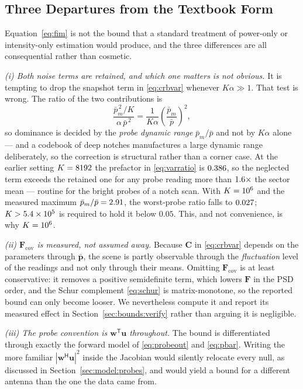 \documentclass[journal]{IEEEtran}
\newcommand{\uv}{\mathbf{u}}
\newcommand{\wv}{\mathbf{w}}
\newcommand{\pv}{\mathbf{p}}
\newcommand{\Herm}{\mathsf{H}}
\newcommand{\Tr}{\mathsf{T}}
\begin{document}
\subsection{Three Departures from the Textbook Form}
\label{sec:bounds:departures}

Equation~\eqref{eq:fim} is not the bound that a standard treatment of
power-only or intensity-only estimation would produce, and the three
differences are all consequential rather than cosmetic.

\emph{(i) Both noise terms are retained, and which one matters is not obvious.}
It is tempting to drop the snapshot term in \eqref{eq:crbvar} whenever
$K\alpha \gg 1$. That test is wrong. The ratio of the two contributions is
\begin{equation}
\frac{\bar{p}_m^{\,2}/K}{\alpha\,\bar{p}^{\,2}}
= \frac{1}{K\alpha}\left(\frac{\bar{p}_m}{\bar{p}}\right)^{\!2},
\label{eq:varratio}
\end{equation}
so dominance is decided by the \emph{probe dynamic range}
$\bar{p}_m/\bar{p}$ and not by $K\alpha$ alone --- and a codebook of deep
notches manufactures a large dynamic range deliberately, so the correction is
structural rather than a corner case. At the earlier setting $K = 8192$ the
prefactor in \eqref{eq:varratio} is $0.386$, so the neglected term
exceeds the retained one for any probe reading more than $1.6\times$
the sector mean --- routine for the bright probes of a notch scan. With
$K = 10^{6}$ and the measured maximum $\bar{p}_m/\bar{p} = 2.91$,
the worst-probe ratio falls to $0.027$; $K > 5.4\times10^{5}$ is required to
hold it below $0.05$. This, and not convenience, is why $K = 10^{6}$.

\emph{(ii) $\mathbf{F}_{\mathrm{cov}}$ is measured, not assumed away.} Because
$\mathbf{C}$ in \eqref{eq:crbvar} depends on the parameters through
$\bar{\pv}$, the scene is partly observable through the \emph{fluctuation}
level of the readings and not only through their means. Omitting
$\mathbf{F}_{\mathrm{cov}}$ is at least conservative: it removes a positive
semidefinite term, which lowers $\mathbf{F}$ in the PSD order, and the Schur
complement \eqref{eq:schur} is matrix-monotone, so the reported bound can only
become looser. We nevertheless compute it and report its measured effect in
Section~\ref{sec:bounds:verify} rather than arguing it is negligible.

\emph{(iii) The probe convention is $\wv^{\Tr}\uv$ throughout.} The bound is
differentiated through exactly the forward model of \eqref{eq:probeout} and
\eqref{eq:pbar}. Writing the more familiar $|\wv^{\Herm}\uv|^2$ inside the
Jacobian would silently relocate every null, as discussed in
Section~\ref{sec:model:probes}, and would yield a bound for a different
antenna than the one the data came from.
\end{document}
